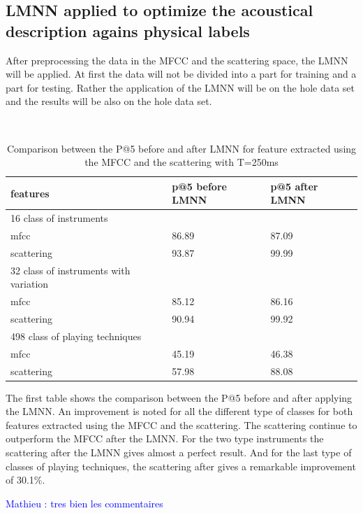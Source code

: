 \documentclass[hidelinks,12pt]{report}
\newcommand{\ml}[1]{\textcolor{blue}{ Mathieu : #1}}
\begin{document}
\subsection{LMNN applied to optimize the acoustical description agains physical labels}
After preprocessing the data in the MFCC and the scattering space, the LMNN will be applied. At first the data will not be divided into a part for training and a part for testing. Rather the application of the LMNN will be on the hole data set and the results will be also on the hole data set.
\begin{table} [H]
\begin{center} 
\ 
 \setlength{\tabcolsep}{.16667em} 
\begin{tabular}{|l|l|l|} 
\hline
features & p@5 before LMNN & p@5 after LMNN \\ 
\hline 
16 class of instruments \\ 
\hline
mfcc & 86.89& 87.09  \\ 
scattering & 93.87 & 99.99  \\ 

\hline 
32 class of instruments with variation \\ 
\hline
mfcc & 85.12 & 86.16  \\ 
scattering & 90.94 & 99.92  \\ 
\hline 
498 class of playing techniques \\ 
\hline
mfcc &  45.19 & 46.38  \\ 
scattering & 57.98 & 88.08  \\ 
\hline
\end{tabular} 
\end{center} 
\caption{Comparison between the P@5 before and after LMNN for feature extracted using the MFCC and the scattering with T=250ms} 
\label{you} 
\end{table}

The first table shows the comparison between the P@5 before and after applying the LMNN. An improvement is noted for all the different type of classes for both features extracted using the MFCC and the scattering. The scattering continue to outperform the MFCC after the LMNN. For the two type instruments the scattering after the LMNN gives almost a perfect result. And for the last type of classes of playing techniques, the scattering after gives a remarkable improvement of 30.1\%.

\ml{tres bien les commentaires}
\end{document}
